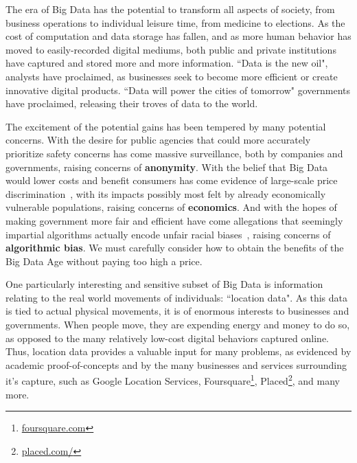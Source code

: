 The era of Big Data has the potential to transform all aspects of society, from business operations to individual leisure time, from medicine to elections.
As the cost of computation and data storage has fallen, and as more human behavior has moved to easily-recorded digital mediums, both public and private institutions have captured and stored more and more information.
``Data is the new oil", analysts have proclaimed, as businesses seek to become more efficient or create innovative digital products. %
``Data will power the cities of tomorrow" governments have proclaimed, releasing their troves of data to the world.

The excitement of the potential gains has been tempered by many potential concerns.
With the desire for public agencies that could more accurately prioritize safety concerns has come massive surveillance, both by companies and governments, raising concerns of \textbf{anonymity}. %
With the belief that Big Data would lower costs and benefit consumers has come evidence of large-scale price discrimination~\cite{wsj, Anonymous:2012wi}, with its impacts possibly most felt by already economically vulnerable populations, raising concerns of \textbf{economics}.
And with the hopes of making government more fair and efficient have come allegations that seemingly impartial algorithms actually encode unfair racial biases~\cite{propublica:bias}, raising concerns of \textbf{algorithmic bias}.
We must carefully consider how to obtain the benefits of the Big Data Age without paying too high a price.

One particularly interesting and sensitive subset of Big Data is information relating to the real world movements of individuals: ``location data".
As this data is tied to actual physical movements, it is of enormous interests to businesses and governments.
When people move, they are expending energy and money to do so, as opposed to the many relatively low-cost digital behaviors captured online.
Thus, location data provides a valuable input for many problems, as evidenced by academic proof-of-concepts and by the many businesses and services surrounding it's capture, such as Google Location Services, Foursquare\footnote{\url{foursquare.com}}, Placed\footnote{\url{placed.com/}}, and many more.

